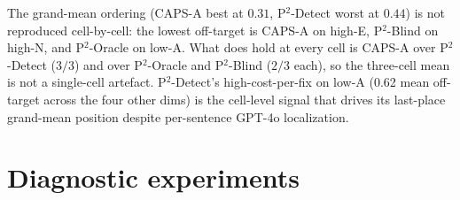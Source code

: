 \begin{table}[t]
\centering
{}
\caption{\S~\ref{sec:4.7} off-target preservation per workflow $\times$ per cell on the MiniMax-M2.7-highspeed subject, sourced from the \texttt{off\_\allowbreak{}target\_\allowbreak{}mean} column of \texttt{aggregate.csv}. Each cell value is the mean over $n$ seeds (3 for high-E / high-N / low-O; 2 for low-A); the \textit{three-cell mean} column is per-cell mean then mean-of-means over high-E, high-N, low-A (low-O is excluded because P$^2$-sanity has a $0/9$ pass rate there, so P$^2$ workflows are undefined on it) and matches the \S~\ref{sec:4.7} Off-target preservation paragraph. CAPS-A grand mean over four cells (low-O included) is $0.32$, also reported in \S~\ref{sec:4.7}.}
\label{tab:rq7-mm-offtarget}
\end{table}

The grand-mean ordering (CAPS-A best at $0.31$, P$^2$-Detect worst at $0.44$) is not reproduced cell-by-cell: the lowest off-target is CAPS-A on high-E, P$^2$-Blind on high-N, and P$^2$-Oracle on low-A. What does hold at every cell is CAPS-A over P$^2$-Detect ($3/3$) and over P$^2$-Oracle and P$^2$-Blind ($2/3$ each), so the three-cell mean is not a single-cell artefact. P$^2$-Detect's high-cost-per-fix on low-A (0.62 mean off-target across the four other dims) is the cell-level signal that drives its last-place grand-mean position despite per-sentence GPT-4o localization.

\section{Diagnostic experiments}
\label{app:B}

